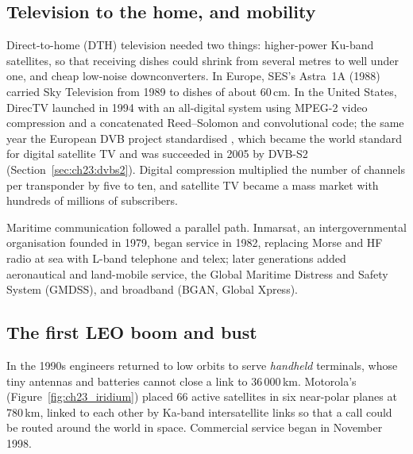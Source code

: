 
\subsection{Television to the home, and mobility}

Direct-to-home (DTH) television needed two things: higher-power Ku-band satellites, so that
receiving dishes could shrink from several metres to well under one, and cheap low-noise
downconverters. In Europe, SES's Astra~1A (1988) carried Sky Television from 1989 to dishes
of about 60\,cm. In the United States, DirecTV launched in 1994 with an all-digital system
using MPEG-2 video compression and a concatenated Reed--Solomon and convolutional code; the same
year the European DVB project standardised , which became the world standard for
digital satellite TV and was succeeded in 2005 by DVB-S2 (Section~\ref{sec:ch23:dvbs2}).
Digital compression multiplied the number of channels per transponder by five to ten, and
satellite TV became a mass market with hundreds of millions of subscribers.

Maritime communication followed a parallel path. Inmarsat, an intergovernmental organisation
founded in 1979, began service in 1982, replacing Morse and HF radio at sea with L-band telephone
and telex; later generations added aeronautical and land-mobile service, the Global Maritime
Distress and Safety System (GMDSS), and broadband (BGAN, Global Xpress).

\subsection{The first LEO boom and bust}

In the 1990s engineers returned to low orbits to serve \emph{handheld} terminals, whose tiny
antennas and batteries cannot close a link to 36\,000\,km. Motorola's 
(Figure~\ref{fig:ch23_iridium}) placed 66 active satellites in six near-polar planes at 780\,km,
linked to each other by Ka-band intersatellite links so that a call could be routed around the
world in space. Commercial service began in November 1998.


